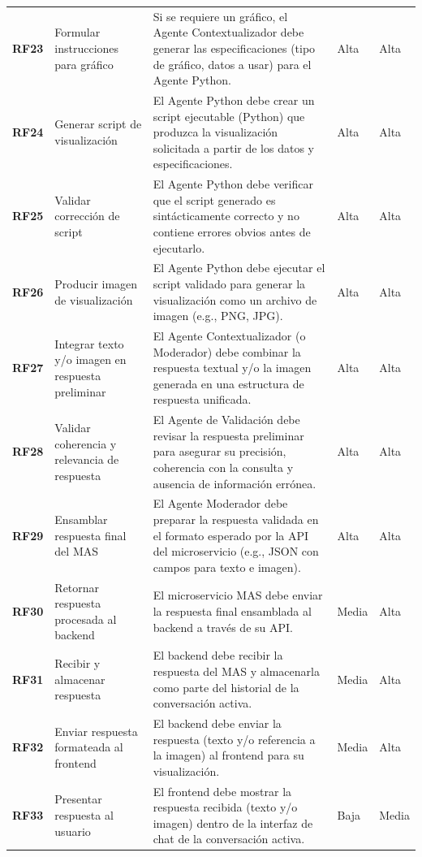\begin{longtable}{@{}l >{\raggedright\arraybackslash}p{4.5cm} >{\raggedright\arraybackslash}p{6.5cm} l l@{}}
	\textbf{RF23} & Formular instrucciones para gráfico & Si se requiere un gráfico, el Agente Contextualizador debe generar las especificaciones (tipo de gráfico, datos a usar) para el Agente Python. & Alta & Alta \\ 
	\textbf{RF24} & Generar script de visualización & El Agente Python debe crear un script ejecutable (Python) que produzca la visualización solicitada a partir de los datos y especificaciones. & Alta & Alta \\ 
	\textbf{RF25} & Validar corrección de script & El Agente Python debe verificar que el script generado es sintácticamente correcto y no contiene errores obvios antes de ejecutarlo. & Alta & Alta \\ 
	\textbf{RF26} & Producir imagen de visualización & El Agente Python debe ejecutar el script validado para generar la visualización como un archivo de imagen (e.g., PNG, JPG). & Alta & Alta \\ 
	\textbf{RF27} & Integrar texto y/o imagen en respuesta preliminar & El Agente Contextualizador (o Moderador) debe combinar la respuesta textual y/o la imagen generada en una estructura de respuesta unificada. & Alta & Alta \\ 
	\textbf{RF28} & Validar coherencia y relevancia de respuesta & El Agente de Validación debe revisar la respuesta preliminar para asegurar su precisión, coherencia con la consulta y ausencia de información errónea. & Alta & Alta \\ 
	\textbf{RF29} & Ensamblar respuesta final del MAS & El Agente Moderador debe preparar la respuesta validada en el formato esperado por la API del microservicio (e.g., JSON con campos para texto e imagen). & Alta & Alta \\ 
	\textbf{RF30} & Retornar respuesta procesada al backend & El microservicio MAS debe enviar la respuesta final ensamblada al backend a través de su API. & Media & Alta \\ 
	\textbf{RF31} & Recibir y almacenar respuesta & El backend debe recibir la respuesta del MAS y almacenarla como parte del historial de la conversación activa. & Media & Alta \\ 
	\textbf{RF32} & Enviar respuesta formateada al frontend & El backend debe enviar la respuesta (texto y/o referencia a la imagen) al frontend para su visualización. & Media & Alta \\ 
	\textbf{RF33} & Presentar respuesta al usuario & El frontend debe mostrar la respuesta recibida (texto y/o imagen) dentro de la interfaz de chat de la conversación activa. & Baja & Media \\ 
	
\end{longtable}

